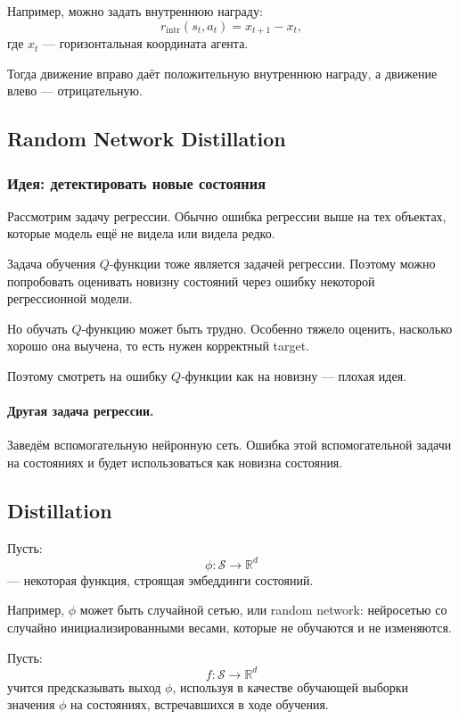 \documentclass[12pt,a4paper]{article}
\begin{document}
Например, можно задать внутреннюю награду:
\[
r_{\mathrm{intr}}(s_t,a_t)
=
x_{t+1}-x_t,
\]
где $x_t$ --- горизонтальная координата агента.

Тогда движение вправо даёт положительную внутреннюю награду, а движение влево --- отрицательную.

\subsection{Random Network Distillation}

\subsubsection{Идея: детектировать новые состояния}

Рассмотрим задачу регрессии. Обычно ошибка регрессии выше на тех объектах, которые модель ещё не видела или видела редко.

Задача обучения $Q$-функции тоже является задачей регрессии. Поэтому можно попробовать оценивать новизну состояний через ошибку некоторой регрессионной модели.

Но обучать $Q$-функцию может быть трудно. Особенно тяжело оценить, насколько хорошо она выучена, то есть нужен корректный target.

Поэтому смотреть на ошибку $Q$-функции как на новизну --- плохая идея.

\paragraph{Другая задача регрессии.}

Заведём вспомогательную нейронную сеть. Ошибка этой вспомогательной задачи на состояниях и будет использоваться как новизна состояния.

\subsection{Distillation}

Пусть:
\[
\phi:\mathcal S\to\mathbb R^d
\]
--- некоторая функция, строящая эмбеддинги состояний.

Например, $\phi$ может быть случайной сетью, или random network: нейросетью со случайно инициализированными весами, которые не обучаются и не изменяются.

Пусть:
\[
f:\mathcal S\to\mathbb R^d
\]
учится предсказывать выход $\phi$, используя в качестве обучающей выборки значения $\phi$ на состояниях, встречавшихся в ходе обучения.
\end{document}
